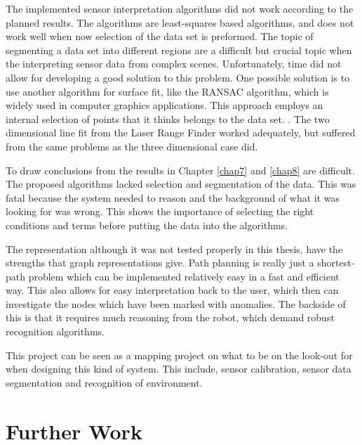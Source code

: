The implemented sensor interpretation algorithms did not work according to the planned
results. The algorithms are least-squares based algorithms, and does not work well when
now selection of the data set is preformed. The topic of segmenting a data set into
different regions are a difficult but crucial topic when the interpreting sensor data from
complex scenes. Unfortunately, time did not allow for developing a good solution to this
problem. One possible solution is to use another algorithm for surface fit, like the
RANSAC algorithm, which is widely used in computer graphics applications. This approach
employs an internal selection of points that it thinks belongs to the data set.
\cite{ransac}. The two dimensional line fit from the Laser Range Finder worked adequately,
but suffered from the same problems as the three dimensional case did. 




To draw conclusions from the results in Chapter \ref{chap7} and \ref{chap8} are difficult.
The proposed algorithms lacked selection and segmentation of the data. This was fatal
because the system needed to reason and the background of what it was looking for was
wrong. This shows the importance of selecting the right conditions and terms before
putting the data into the algorithms.

The representation although it was not tested properly in this thesis, have
the strengths that graph representations give. Path planning is
really just a shortest-path problem which can be implemented relatively easy in a fast and
efficient way. This also allows for easy interpretation back to the user, which then can
investigate the nodes which have been marked with anomalies. The backside of this is that
it requires much reasoning from the robot, which demand robust recognition algorithms.


This project can be seen as a mapping project on what to be on the look-out for when
designing this kind of system. This include, sensor calibration, sensor data
segmentation and recognition of environment.



\section{Further Work}


